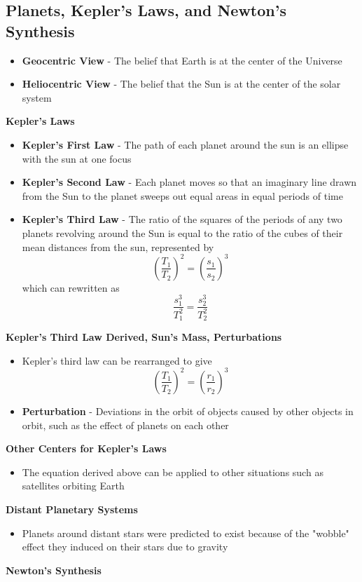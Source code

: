 \subsection{Planets, Kepler's Laws, and Newton's Synthesis}
\begin{itemize}
    \item \textbf{Geocentric View} - The belief that Earth is at the center of the Universe
    \item \textbf{Heliocentric View} - The belief that the Sun is at the center of the solar system
\end{itemize}
\textbf{Kepler's Laws}
\begin{itemize}
    \item \textbf{Kepler's First Law} - The path of each planet around the sun is an ellipse with the sun at one focus
    \item \textbf{Kepler's Second Law} - Each planet moves so that an imaginary line drawn from the Sun to the planet sweeps out equal areas in equal periods of time
    \item \textbf{Kepler's Third Law} - The ratio of the squares of the periods of any two planets revolving around the Sun is equal to the ratio of the cubes of their mean distances from the sun, represented by \[(\frac{T_1}{T_2})^2=(\frac{s_1}{s_2})^3\] which can rewritten as \[\frac{s_1^3}{T_1^2}=\frac{s_2^3}{T_2^2}\]
\end{itemize}
\textbf{Kepler's Third Law Derived, Sun's Mass, Perturbations}
\begin{itemize}
    \item Kepler's third law can be rearranged to give \[(\frac{T_1}{T_2})^2=(\frac{r_1}{r_2})^3\]
    \item \textbf{Perturbation} - Deviations in the orbit of objects caused by other objects in orbit, such as the effect of planets on each other
\end{itemize}
\textbf{Other Centers for Kepler's Laws}
\begin{itemize}
    \item The equation derived above can be applied to other situations such as satellites orbiting Earth
\end{itemize}
\textbf{Distant Planetary Systems}
\begin{itemize}
    \item Planets around distant stars were predicted to exist because of the "wobble" effect they induced on their stars due to gravity
\end{itemize}
\textbf{Newton's Synthesis}
